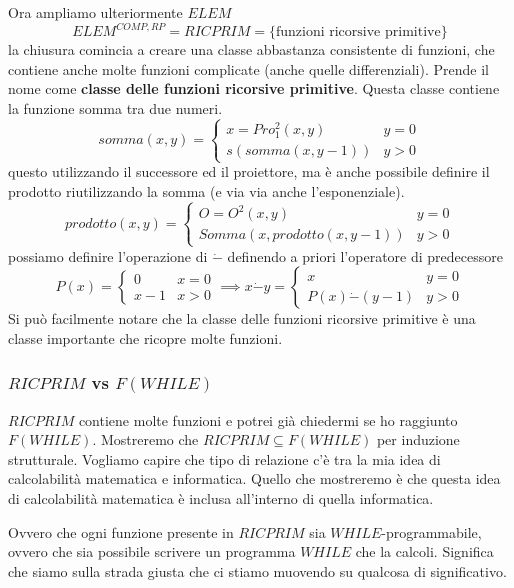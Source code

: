 \documentclass{article}
\begin{document}
Ora ampliamo ulteriormente $ELEM$
$$ELEM^{COMP,RP}=RICPRIM=\{\text{funzioni ricorsive primitive}\}$$
la chiusura comincia a creare una classe abbastanza consistente di funzioni, che contiene
anche molte funzioni complicate (anche quelle differenziali). Prende il nome come
\textbf{classe delle funzioni ricorsive primitive}. Questa classe contiene la funzione
somma tra due numeri.
\[
    somma(x,y)=
    \begin{cases}
        x=Pro^2_1(x,y)  & y=0 \\
        s(somma(x,y-1)) & y>0
    \end{cases}
\]
questo utilizzando il successore ed il proiettore, ma è anche possibile definire il prodotto
riutilizzando la somma (e via via anche l'esponenziale).
\[
    prodotto(x,y)=
    \begin{cases}
        O=O^2(x,y)                & y=0 \\
        Somma(x, prodotto(x,y-1)) & y>0
    \end{cases}
\]
possiamo definire l'operazione di $\dot{-}$ definendo a priori l'operatore di predecessore
\[
    P(x)=
    \begin{cases}
        0   & x=0 \\
        x-1 & x>0
    \end{cases}
    \implies
    x\dot{-}y=
    \begin{cases}
        x                & y=0 \\
        P(x)\dot{-}(y-1) & y>0
    \end{cases}
\]
Si può facilmente notare che la classe delle funzioni ricorsive primitive è una classe
importante che ricopre molte funzioni.

\subsubsection{$RICPRIM$ vs $F(WHILE)$}
$RICPRIM$ contiene molte funzioni e potrei già chiedermi se ho raggiunto $F(WHILE)$. Mostreremo
che $RICPRIM\subseteq F(WHILE)$ per induzione strutturale. Vogliamo capire che tipo di relazione
c'è tra la mia idea di calcolabilità matematica e informatica. Quello che mostreremo
è che questa idea di calcolabilità matematica è inclusa all'interno di quella informatica.

Ovvero che ogni funzione presente in $RICPRIM$ sia $WHILE$-programmabile, ovvero che sia
possibile scrivere un programma $WHILE$ che la calcoli. Significa che siamo sulla strada
giusta che ci stiamo muovendo su qualcosa di significativo.
\end{document}
